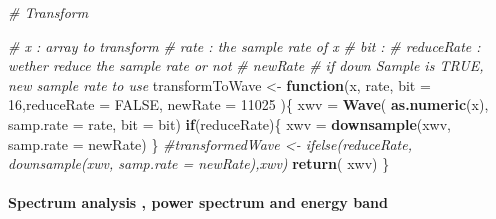 \documentclass[]{article}
\newenvironment{Shaded}{\begin{snugshade}}{\end{snugshade}}
\newcommand{\KeywordTok}[1]{\textcolor[rgb]{0.13,0.29,0.53}{\textbf{#1}}}
\newcommand{\DataTypeTok}[1]{\textcolor[rgb]{0.13,0.29,0.53}{#1}}
\newcommand{\DecValTok}[1]{\textcolor[rgb]{0.00,0.00,0.81}{#1}}
\newcommand{\StringTok}[1]{\textcolor[rgb]{0.31,0.60,0.02}{#1}}
\newcommand{\CommentTok}[1]{\textcolor[rgb]{0.56,0.35,0.01}{\textit{#1}}}
\newcommand{\OtherTok}[1]{\textcolor[rgb]{0.56,0.35,0.01}{#1}}
\newcommand{\ControlFlowTok}[1]{\textcolor[rgb]{0.13,0.29,0.53}{\textbf{#1}}}
\newcommand{\NormalTok}[1]{#1}
\let\oldparagraph\paragraph
\renewcommand{\paragraph}[1]{\oldparagraph{#1}\mbox{}}
\begin{document}
\begin{Shaded}
\begin{Highlighting}[]
\CommentTok{# Transform}


\CommentTok{# x : array to transform }
\CommentTok{# rate : the sample rate of x }
\CommentTok{# bit : }
\CommentTok{# reduceRate : wether reduce the sample rate or not }
\CommentTok{# newRate  # if down Sample is TRUE, new sample rate to use }
\NormalTok{transformToWave <-}\StringTok{ }\ControlFlowTok{function}\NormalTok{(x, rate, }\DataTypeTok{bit =} \DecValTok{16}\NormalTok{,}\DataTypeTok{reduceRate =} \OtherTok{FALSE}\NormalTok{, }\DataTypeTok{newRate =} \DecValTok{11025}\NormalTok{ )\{}
\NormalTok{  xwv =}\StringTok{ }\KeywordTok{Wave}\NormalTok{( }\KeywordTok{as.numeric}\NormalTok{(x), }\DataTypeTok{samp.rate =}\NormalTok{ rate, }\DataTypeTok{bit =}\NormalTok{ bit)}
  \ControlFlowTok{if}\NormalTok{(reduceRate)\{}
\NormalTok{    xwv =}\StringTok{ }\KeywordTok{downsample}\NormalTok{(xwv, }\DataTypeTok{samp.rate =}\NormalTok{ newRate)}
\NormalTok{  \}}
  \CommentTok{#transformedWave <- ifelse(reduceRate,  downsample(xwv, samp.rate = newRate),xwv)}
  \KeywordTok{return}\NormalTok{( xwv)}
\NormalTok{\}}
\end{Highlighting}
\end{Shaded}

\paragraph{Spectrum analysis , power spectrum and energy
band}\label{spectrum-analysis-power-spectrum-and-energy-band}
\end{document}

